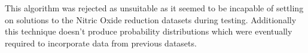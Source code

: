 
This algorithm was rejected as unsuitable as it seemed to be incapable of settling on solutions to the Nitric Oxide reduction datasets during testing. Additionally this technique doesn't produce probability distributions which were eventually required to incorporate data from previous datasets.


